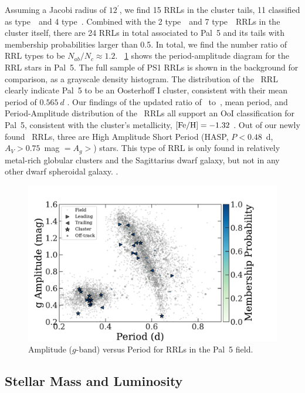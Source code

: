 \documentclass[twocolumn]{aastex63}
\begin{document}
Assuming a Jacobi radius of $12^\prime$, we find 15 RRLs in the cluster tails, 11 classified as type~\typeab\ and 4 type~\typec.
Combined with the 2 type~\typeab\ and 7 type~\typec\ RRLs in the cluster itself, there are 24 RRLs in total associated to Pal~5 and its tails with membership probabilities larger than 0.5.
In total, we find the number ratio of RRL types to be $N_{ab} / N_{c} \approx 1.2$.
\figurename~\ref{fig:PA_diagram} shows the period-amplitude diagram for the RRL stars in Pal~5.
The full sample of PS1 RRLs is shown in the background for comparison, as a grayscale density histogram. The distribution of the \typeab~RRL clearly indicate Pal~5 to be an Oosterhoff I cluster, consistent with their mean period of $0.565~d$ .
Our findings of the updated ratio of \rrab~to~\rrc, mean period, and Period-Amplitude distribution of the \rrab\ RRLs all support an OoI classification for Pal~5, consistent with the cluster's metallicity, $[\mathrm{Fe}/\mathrm{H}]=-1.32$ \citep{TODO}.
Out of our newly found \rrab\ RRLs, three are High Amplitude Short Period (HASP, $P <0.48$~d, $A_V>0.75$~mag $=A_g>$) stars.
This type of RRL is only found in relatively metal-rich globular clusters  \citep[$\FeH>-1.5$;][]{Monelli:2017} and the Sagittarius dwarf galaxy, but not in any other dwarf spheroidal galaxy. .


\begin{figure}[t]
\begin{center}
\includegraphics[width=\textwidth]{rrls_PA.pdf}
\caption{Amplitude ($g$-band) versus Period for RRLs in the Pal~5 field.}
\label{fig:PA_diagram}
\end{center}
\end{figure}

\subsection{Stellar Mass and Luminosity}
\end{document}
